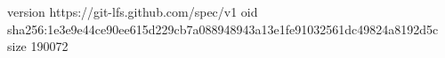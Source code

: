 version https://git-lfs.github.com/spec/v1
oid sha256:1e3e9e44ce90ee615d229cb7a088948943a13e1fe91032561dc49824a8192d5c
size 190072
